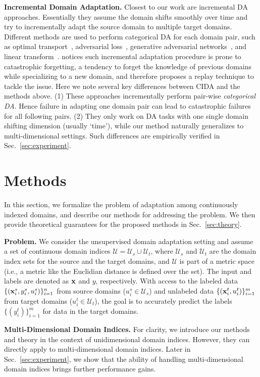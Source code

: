 \documentclass{article}
\newcommand{\secref}[1]{Sec.~\ref{#1}}
\begin{document}
\textbf{Incremental Domain Adaptation.} Closest to our work are incremental DA approaches. Essentially they assume the domain shifts smoothly over time and try to incrementally adapt the source domain to multiple target domains. Different methods are used to perform categorical DA for each domain pair, such as optimal transport~\cite{CDOT}, adversarial loss~\cite{bitarafan2016incremental}, generative adversarial networks~\cite{wulfmeier2018incremental}, and linear transform~\cite{hoffman2014continuous}.   notices such incremental adaptation procedure is prone to catastrophic forgetting, a tendency to forget the knowledge of previous domains while specializing to a new domain, and therefore proposes a replay technique to tackle the issue. Here we note several key differences between CIDA and the methods above. (1) These approaches incrementally perform pair-wise \emph{categorical DA}. Hence failure in adapting one domain pair can lead to catastrophic failures for all following pairs. (2) They only work on DA tasks with one single domain shifting dimension (usually `time'), while our method naturally generalizes to multi-dimensional settings. Such differences are empirically verified in \secref{sec:experiment}. 


 \section{Methods}
\label{sec:method}
In this section, we formalize the problem of adaptation among continuously indexed domains, and describe our methods for addressing the problem. We then provide theoretical guarantees for the proposed methods in \secref{sec:theory}.


\textbf{Problem.} We consider the unsupervised domain adaptation setting and assume a set of continuous domain indices $\mathcal{U}=\mathcal{U}_s \cup \mathcal{U}_t$, where $\mathcal{U}_s$ and $\mathcal{U}_t$ are the domain index sets for the source and the target domains, and $\mathcal{U}$ is part of a metric space (i.e., a metric like the Euclidian distance is defined over the set). The input and labels are denoted as ${\bf x}$ and $y$, respectively. With access to the labeled data $\{({\bf x}_i^s, y_i^s, u_i^s)\}_{i=1}^n$ from source domains ($u_i^s \in \mathcal{U}_s$) and unlabeled data $\{({\bf x}_i^t, u_i^t)\}_{i=1}^m$ from target domains ($u_i^t \in \mathcal{U}_t$), the goal is to accurately predict the labels $\{(y_i^t)\}_{i=1}^m$ for data in the target domains. 

\textbf{Multi-Dimensional Domain Indices.} 
For clarity, we introduce our methods and theory in the context of unidimensional domain indices. However, they can directly apply to multi-dimensional domain indices. Later in \secref{sec:experiment}, we show that the ability of handling multi-dimensional domain indices brings further performance gains.
\end{document}
